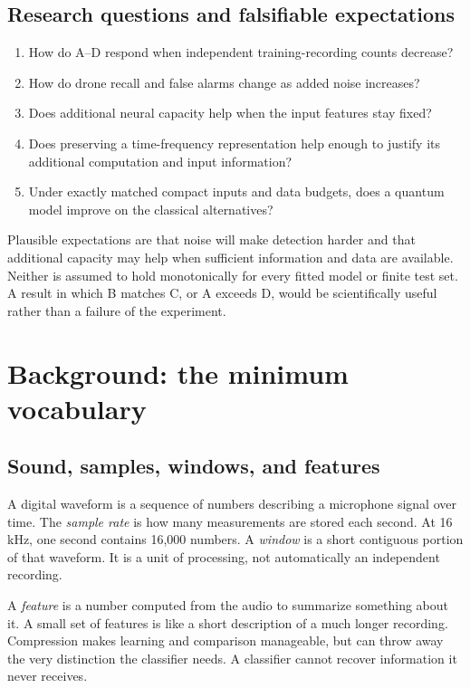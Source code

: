 \documentclass[11pt,letterpaper]{article}
\begin{document}
\subsection{Research questions and falsifiable expectations}
\begin{enumerate}[label=\textbf{RQ\arabic*.}]
 \item How do A--D respond when independent training-recording counts decrease?
 \item How do drone recall and false alarms change as added noise increases?
 \item Does additional neural capacity help when the input features stay fixed?
 \item Does preserving a time-frequency representation help enough to justify
 its additional computation and input information?
 \item Under exactly matched compact inputs and data budgets, does a quantum
 model improve on the classical alternatives?
\end{enumerate}
Plausible expectations are that noise will make detection harder and that
additional capacity may help when sufficient information and data are available.
Neither is assumed to hold monotonically for every fitted model or finite
test set. A result in which B matches C, or A exceeds D, would be scientifically
useful rather than a failure of the experiment.

\section{Background: the minimum vocabulary}
\subsection{Sound, samples, windows, and features}
A digital waveform is a sequence of numbers describing a microphone signal
over time. The \emph{sample rate} is how many measurements are stored each
second. At 16 kHz, one second contains 16,000 numbers. A \emph{window} is a
short contiguous portion of that waveform. It is a unit of processing, not
automatically an independent recording.

A \emph{feature} is a number computed from the audio to summarize something
about it. A small set of features is like a short description of a much longer
recording. Compression makes learning and comparison manageable, but can throw
away the very distinction the classifier needs. A classifier cannot recover
information it never receives.
\end{document}
